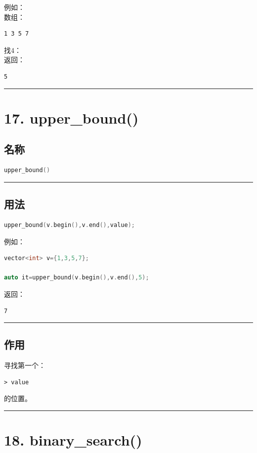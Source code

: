 \documentclass[9pt,twocolumn]{extarticle}
\begin{document}
例如：\\
数组：
\begin{lstlisting}
1 3 5 7
\end{lstlisting}
找4：\\
返回：
\begin{lstlisting}
5
\end{lstlisting}

\noindent\rule{\linewidth}{0.4pt}

\section{17. upper\_bound()}

\subsection{名称}
\begin{lstlisting}[language=C++]
upper_bound()
\end{lstlisting}

\noindent\rule{\linewidth}{0.4pt}

\subsection{用法}
\begin{lstlisting}[language=C++]
upper_bound(v.begin(),v.end(),value);
\end{lstlisting}
例如：
\begin{lstlisting}[language=C++]
vector<int> v={1,3,5,7};

auto it=upper_bound(v.begin(),v.end(),5);
\end{lstlisting}
返回：
\begin{lstlisting}
7
\end{lstlisting}

\noindent\rule{\linewidth}{0.4pt}

\subsection{作用}
寻找第一个：
\begin{lstlisting}
> value
\end{lstlisting}
的位置。

\noindent\rule{\linewidth}{0.4pt}

\section{18. binary\_search()}
\end{document}

